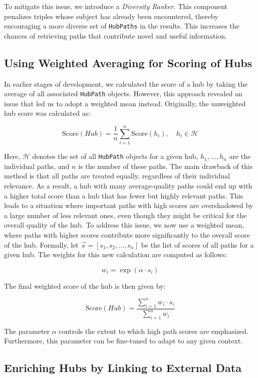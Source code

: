 To mitigate this issue, we introduce a \emph{Diversity Ranker}. This component penalizes triples whose subject has already been encountered, thereby encouraging a more diverse set of \texttt{HubPaths} in the results. This increases the chances of retrieving paths that contribute novel and useful information. 

\subsection{Using Weighted Averaging for Scoring of Hubs}

In earlier stages of development, we calculated the score of a hub by taking the average of all associated \texttt{HubPath} objects. However, this approach revealed an issue that led us to adopt a weighted mean instead. Originally, the unweighted hub score was calculated as:

\[
\text{Score}(Hub) = \frac{1}{n} \sum_{i=1}^{n} \text{Score}(h_i), \quad h_i \in \mathcal{H}
\]

Here, \( \mathcal{H} \) denotes the set of all \texttt{HubPath} objects for a given hub, \( h_1, \dots, h_n \) are the individual paths, and \( n \) is the number of these paths. The main drawback of this method is that all paths are treated equally, regardless of their individual relevance. As a result, a hub with many average-quality paths could end up with a higher total score than a hub that has fewer but highly relevant paths. This leads to a situation where important paths with high scores are overshadowed by a large number of less relevant ones, even though they might be critical for the overall quality of the hub. To address this issue, we now use a weighted mean, where paths with higher scores contribute more significantly to the overall score of the hub. Formally, let \( \vec{s} = [s_1, s_2, \dots, s_n] \) be the list of scores of all paths for a given hub. The weights for this new calculation are computed as follows:

\[
w_i = \exp(\alpha \cdot s_i)
\]

The final weighted score of the hub is then given by:

\[
\text{Score}(Hub) = \frac{\sum_{i=1}^{n} w_i \cdot s_i}{\sum_{i=1}^{n} w_i}
\]

The parameter \( \alpha \) controls the extent to which high path scores are emphasized. Furthermore, this parameter can be fine-tuned to adapt to any given context. 


\subsection{Enriching Hubs by Linking to External Data}


